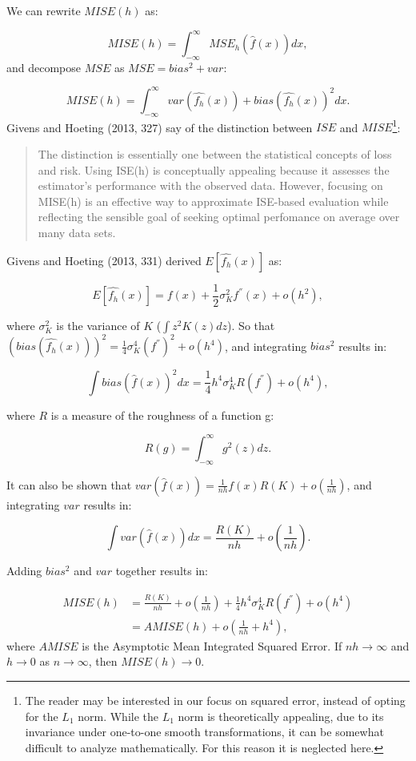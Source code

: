 \documentclass[]{article}
\let\rmarkdownfootnote\footnote%
\def\footnote{\protect\rmarkdownfootnote}
\begin{document}
We can rewrite \(MISE(h)\) as:

\[MISE(h) = \int_{-\infty}^{\infty}MSE_h\left(\hat{f}(x)\right)dx,\] and
decompose \(MSE\) as \(MSE = bias^2 + var\):

\[MISE(h) = \int_{-\infty}^{\infty} var\left(\widehat{f_h}(x)\right) + bias\left(\widehat{f_h}(x)\right)^2 dx.\]
Givens and Hoeting (2013, 327) say of the distinction between \(ISE\)
and \(MISE\)\footnote{The reader may be interested in our focus on
  squared error, instead of opting for the \(L_1\) norm. While the
  \(L_1\) norm is theoretically appealing, due to its invariance under
  one-to-one smooth transformations, it can be somewhat difficult to
  analyze mathematically. For this reason it is neglected here.}:

\begin{quote}
The distinction is essentially one between the statistical concepts of
loss and risk. Using ISE(h) is conceptually appealing because it
assesses the estimator's performance with the observed data. However,
focusing on MISE(h) is an effective way to approximate ISE-based
evaluation while reflecting the sensible goal of seeking optimal
perfomance on average over many data sets.
\end{quote}

Givens and Hoeting (2013, 331) derived \(E[\widehat{f_h}(x)]\) as:

\[E[\widehat{f_h}(x)] = f(x) + \frac{1}{2} \sigma_K^2f^{''}(x) + o(h^2),\]

where \(\sigma_K^2\) is the variance of \(K\) (\(\int z^2 K(z) dz\)). So
that
\(\left(bias(\widehat{f_h}(x))\right)^2 = \frac{1}{4}\sigma_K^4 (f^{''})^2 + o(h^4)\),
and integrating \(bias^2\) results in:

\[\int bias\left(\hat{f}(x)\right)^2 dx = \frac{1}{4} h^4 \sigma_K^4 R(f^{''}) + o(h^4),\]

where \(R\) is a measure of the roughness of a function g:

\[R(g) = \int_{-\infty}^{\infty}g^2(z) dz.\]

It can also be shown that
\(var\left(\hat{f}(x)\right) = \frac{1}{nh}f(x)R(K) + o(\frac{1}{nh})\),
and integrating \(var\) results in:

\[\int var\left(\hat{f}(x)\right)dx = \frac{R(K)}{nh} + o\left(\frac{1}{nh}\right).\]

Adding \(bias^2\) and \(var\) together results in:

\[
\begin{aligned}
MISE(h) &= \frac{R(K)}{nh} + o\left(\frac{1}{nh}\right) + \frac{1}{4}h^4 \sigma_K^4R(f^{''}) + o\left(h^4\right) \\
&= AMISE(h) + o\left(\frac{1}{nh} + h^4\right),
\end{aligned}
\] where \(AMISE\) is the Asymptotic Mean Integrated Squared Error. If
\(nh \rightarrow \infty\) and \(h \rightarrow 0\) as
\(n \rightarrow \infty\), then \(MISE(h) \rightarrow 0\).
\end{document}
